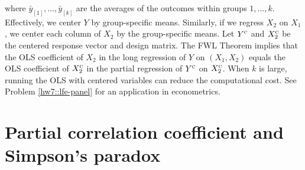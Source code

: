 where $\bar{y}_{[1]},\ldots,\bar{y}_{[k]}$ are the averages of the
outcomes within groups $1,\ldots,k$. Effectively, we center $Y$ by
group-specific means. Similarly, if we regress $X_{2}$ on $X_{1}$,
we center each column of $X_{2}$ by the group-specific means. Let
$Y^{\textsc{c}}$ and $X_{2}^{\textsc{c}}$ be the centered response
vector and design matrix. The FWL Theorem implies that the OLS coefficient
of $X_{2}$ in the long regression of $Y$ on $(X_1, X_2)$ equals the OLS coefficient of $X_{2}^{\textsc{c}}$
in the partial regression of $Y^{\textsc{c}}$ on $X_{2}^{\textsc{c}}$.
When $k$ is large, running the OLS with centered variables can reduce
the computational cost. 
See Problem \ref{hw7::lfe-panel} for an application in econometrics. 





\section{Partial correlation coefficient and Simpson's paradox\label{sec:Partial-correlation-coefficient}}

